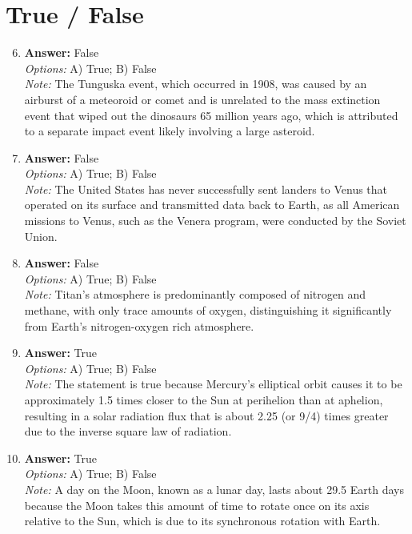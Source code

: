 \documentclass[12pt]{article}
\begin{document}
\section*{True / False}
\begin{enumerate}[label=\arabic*.]
\setcounter{enumi}{5}
\item \textbf{Answer:} False
\\ \textit{Options:} A) True; B) False
\\ \textit{Note:} The Tunguska event, which occurred in 1908, was caused by an airburst of a meteoroid or comet and is unrelated to the mass extinction event that wiped out the dinosaurs 65 million years ago, which is attributed to a separate impact event likely involving a large asteroid.
\item \textbf{Answer:} False
\\ \textit{Options:} A) True; B) False
\\ \textit{Note:} The United States has never successfully sent landers to Venus that operated on its surface and transmitted data back to Earth, as all American missions to Venus, such as the Venera program, were conducted by the Soviet Union.
\item \textbf{Answer:} False
\\ \textit{Options:} A) True; B) False
\\ \textit{Note:} Titan's atmosphere is predominantly composed of nitrogen and methane, with only trace amounts of oxygen, distinguishing it significantly from Earth's nitrogen-oxygen rich atmosphere.
\item \textbf{Answer:} True
\\ \textit{Options:} A) True; B) False
\\ \textit{Note:} The statement is true because Mercury's elliptical orbit causes it to be approximately 1.5 times closer to the Sun at perihelion than at aphelion, resulting in a solar radiation flux that is about 2.25 (or 9/4) times greater due to the inverse square law of radiation.
\item \textbf{Answer:} True
\\ \textit{Options:} A) True; B) False
\\ \textit{Note:} A day on the Moon, known as a lunar day, lasts about 29.5 Earth days because the Moon takes this amount of time to rotate once on its axis relative to the Sun, which is due to its synchronous rotation with Earth.
\end{enumerate}
\end{document}
